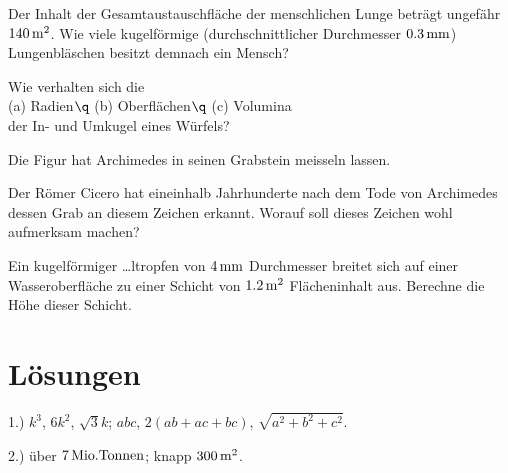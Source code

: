 \documentclass[%
11pt,%
twoside,%
titlepage,%
a4page,%
german,%
headsepline%
]{scrartcl}
\begin{document}
\begin{ueb}
Der Inhalt der Gesamtaustauschfl\"ache der menschlichen Lunge betr\"agt ungef\"ahr $\unit[140]{m^2}$. Wie viele kugelf\"ormige (durchschnittlicher Durchmesser $\unit[0.3]{mm}$) Lungenbl\"aschen besitzt demnach ein Mensch?
\end{ueb}

\begin{ueb}
Wie verhalten sich die\\[1ex]
\hspace*{2.7ex}(a) Radien$\q$ (b) Oberfl\"achen$\q$ (c) Volumina\\[1ex]
der In- und Umkugel eines W\"urfels?
\end{ueb}

\begin{ueb}
Die Figur hat Archimedes in seinen Grabstein meisseln lassen.
\begin{center}
\end{center}
Der R\"omer Cicero hat eineinhalb Jahrhunderte nach dem Tode von Archimedes dessen Grab an diesem Zeichen erkannt. Worauf soll dieses Zeichen wohl aufmerksam machen?
\end{ueb}

\begin{ueb}
Ein kugelf\"ormiger …ltropfen von $\unit[4]{mm}$ Durchmesser breitet sich auf einer Wasseroberfl\"ache zu einer Schicht von $\unit[1.2]{m^2}$ Fl\"acheninhalt aus. Berechne die H\"ohe dieser Schicht.
\end{ueb}

\section*{L\"osungen}

1.) $k^3$, $6k^2$, $\sqrt{3}k$; $abc$, $2(ab+ac+bc)$, $\sqrt{a^2+b^2+c^2}$.

2.) \"uber $\unit[7]{Mio. Tonnen}$; knapp $\unit[300]{m^2}$.
\end{document}
